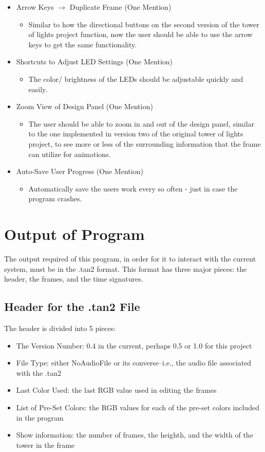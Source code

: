 \documentclass[12pt]{extarticle}
\begin{document}
\begin{itemize}
\begin{itemize}
	\end{itemize}
	\item Arrow Keys $\rightarrow$ Duplicate Frame (One Mention)
	\begin{itemize}
		\item Similar to how the directional buttons on the second version of the tower of lights project function, now the user should be able to use the arrow keys to get the same functionality.
	\end{itemize}
	\item Shortcuts to Adjust LED Settings (One Mention)
	\begin{itemize}
		\item The color/ brightness of the LEDs should be adjustable quickly and easily.
	\end{itemize}
	\item Zoom View of Design Panel (One Mention)
	\begin{itemize}
		\item The user should be able to zoom in and out of the design panel, similar to the one implemented in version two of the original tower of lights project, to see more or less of the surrounding information that the frame can utilize for animations. 
	\end{itemize}
	\item Auto-Save User Progress (One Mention)
	\begin{itemize}
		\item Automatically save the users work every so often - just in case the program crashes.
	\end{itemize}

\end{itemize}

\clearpage

\section{Output of Program}
The output required of this program, in order for it to interact with the current system, must be in the .tan2 format.  This format has three major pieces: the header, the frames, and the time signatures.
\newline
\subsection{Header for the .tan2 File}
The header is divided into 5 pieces:
	\begin{itemize}
		\item The Version Number: 0.4 in the current, perhaps 0.5 or 1.0 for this project
		\item File Type: either NoAudioFile or its converse--i.e., the audio file associated with the .tan2
		\item Last Color Used: the last RGB value used in editing the frames
		\item List of Pre-Set Colors: the RGB values for each of the pre-set colors included in the program
		\item Show information: the number of frames, the heighth, and the width of the tower in the frame
	\end{itemize}
\end{document}
